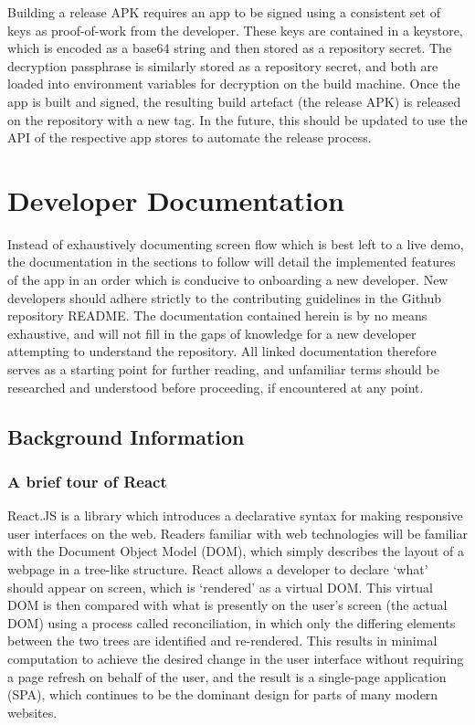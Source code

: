 Building a release APK requires an app to be signed using a consistent set of keys as proof-of-work from the developer. These keys are contained in a keystore, which is encoded as a base64 string and then stored as a repository secret. The decryption passphrase is similarly stored as a repository secret, and both are loaded into environment variables for decryption on the build machine. Once the app is built and signed, the resulting build artefact (the release APK) is released on the repository with a new tag. In the future, this should be updated to use the API of the respective app stores to automate the release process.


\section{Developer Documentation}
Instead of exhaustively documenting screen flow which is best left to a live demo, the documentation in the sections to follow will detail the implemented features of the app in an order which is conducive to onboarding a new developer. New developers should adhere strictly to the contributing guidelines in the Github repository README. The documentation contained herein is by no means exhaustive, and will not fill in the gaps of knowledge for a new developer attempting to understand the repository. All linked documentation therefore serves as a starting point for further reading, and unfamiliar terms should be researched and understood before proceeding, if encountered at any point.

\subsection{Background Information}
\subsubsection{A brief tour of React}
React.JS is a library which introduces a declarative syntax for making responsive user interfaces on the web. Readers familiar with web technologies will be familiar with the Document Object Model (DOM), which simply describes the layout of a webpage in a tree-like structure. React allows a developer to declare `what' should appear on screen, which is `rendered' as a virtual DOM. This virtual DOM is then compared with what is presently on the user's screen (the actual DOM) using a process called reconciliation, in which only the differing elements between the two trees are identified and re-rendered. This results in minimal computation to achieve the desired change in the user interface without requiring a page refresh on behalf of the user, and the result is a single-page application (SPA), which continues to be the dominant design for parts of many modern websites.

